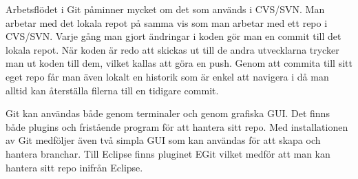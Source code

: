 	Arbetsflödet i Git påminner mycket om det som används i CVS/SVN. Man arbetar med det lokala repot på samma vis som man arbetar med ett repo i CVS/SVN. Varje gång man gjort ändringar i koden gör man en commit till det lokala repot. När koden är redo att skickas ut till de andra utvecklarna trycker man ut koden till dem, vilket kallas att göra en push. Genom att commita till sitt eget repo får man även lokalt en historik som är enkel att navigera i då man alltid kan återställa filerna till en tidigare commit.
	
	Git kan användas både genom terminaler och genom grafiska GUI. Det finns både plugins och fristående program för att hantera sitt repo. Med installationen av Git medföljer även två simpla GUI som kan användas för att skapa och hantera branchar. Till Eclipse finns pluginet EGit vilket medför att man kan hantera sitt repo inifrån Eclipse.